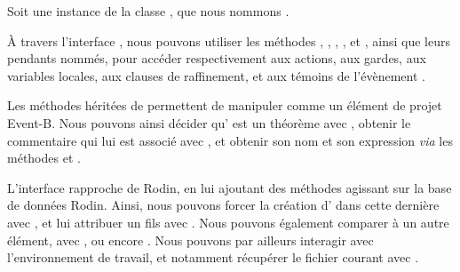 Soit une instance de la classe , que nous nommons .

À travers l'interface , nous pouvons utiliser les méthodes , , , %
, et , ainsi que leurs pendants nommés, pour accéder respectivement aux actions, aux gardes, aux variables locales, %
aux clauses de raffinement, et aux témoins de l'évènement .

Les méthodes héritées de  permettent de manipuler  comme un élément de projet Event-B.
Nous pouvons ainsi décider qu' est un théorème avec , obtenir le commentaire qui lui est associé avec , %
et obtenir son nom et son expression \textit{via} les méthodes  et .

L'interface  rapproche  de Rodin, en lui ajoutant des méthodes agissant sur la base de données Rodin.
Ainsi, nous pouvons forcer la création d' dans cette dernière avec , et lui attribuer un fils avec .
Nous pouvons également comparer  à un autre élément, avec , ou encore .
Nous pouvons par ailleurs interagir avec l'environnement de travail, et notamment récupérer le fichier courant avec .
